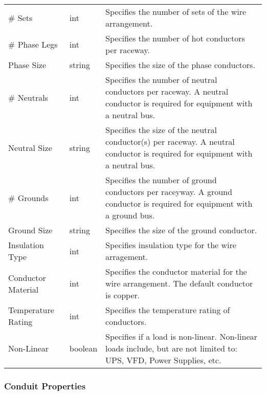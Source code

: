 \documentclass[letterpaper,10pt,english]{sphinxmanual}
\begin{document}
\begin{savenotes}\sphinxattablestart
\centering
\begin{tabulary}{\linewidth}[t]{|T|T|T|}
\hline

&
&
\\
\hline
\# Sets
&
int
&
Specifies the number of sets of the wire arrangement.
\\
\hline
\# Phase Legs
&
int
&
Specifies the number of hot conductors per raceway.
\\
\hline
Phase Size
&
string
&
Specifies the size of the phase conductors.
\\
\hline
\# Neutrals
&
int
&
Specifies the number of neutral conductors per raceway.  A neutral conductor is required for equipment with a neutral bus.
\\
\hline
Neutral Size
&
string
&
Specifies the size of the neutral conductor(s) per raceway.  A neutral conductor is required for equipment with a neutral bus.
\\
\hline
\# Grounds
&
int
&
Specifies the number of ground conductors per raceyway.  A ground conductor is required for equipment with a ground bus.
\\
\hline
Ground Size
&
string
&
Specifies the size of the ground conductor.
\\
\hline
Insulation Type
&
int
&
Specifies insulation type for the wire arragement.
\\
\hline
Conductor Material
&
int
&
Specifies the conductor material for the wire arrangement.  The default conductor is copper.
\\
\hline
Temperature Rating
&
int
&
Specifies the temperature rating of conductors.
\\
\hline
Non-Linear
&
boolean
&
Specifies if a load is non-linear.  Non-linear loads include, but are not limited to: UPS, VFD, Power Supplies, etc.
\\
\hline
\end{tabulary}
\par
\sphinxattableend\end{savenotes}


\subsubsection{Conduit Properties}
\label{\detokenize{docs/definitions/index-definitions:conduit-properties}}\label{\detokenize{docs/definitions/index-definitions:id5}}
\end{document}
